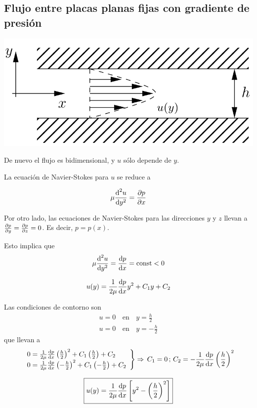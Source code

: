 	
	\subsection{Flujo entre placas planas fijas con gradiente de presión	}
	
	\begin{center}
		\includegraphics[width=0.5\linewidth]{TeX_files/chapter05-FlujoViscoco/placas2}
	\end{center}
	

			De nuevo el flujo es bidimensional, y $u$ sólo depende de $y$.
			
			La ecuación de Navier-Stokes para $u$ se reduce a 
			
\begin{equation}
				\mu\frac{\text{d}^2 u}{\text{d} y^2}=\frac{\partial p}{\partial x}
\end{equation}
			

	
	Por otro lado, las ecuaciones de Navier-Stokes para las direcciones
	$y$ y $z$ llevan a $\frac{\partial p}{\partial y}=\frac{\partial p}{\partial z}=0$. Es decir, $p=p(x)$.
	
	Esto implica que 
	\[
	\mu\frac{\text{d}^2 u}{\text{d} y^2}=\frac{\textrm{d} p}{\textrm{d} x}=\text{const}<0
	\]
	
	\[
	u(y)=\frac{1}{2\mu}\frac{\textrm{d} p}{\textrm{d} x}y^{2}+C_{1}y+C_{2}
	\]

	Las condiciones de contorno son 
\begin{eqnarray*}
	u=0\, & \text{en} & \,y=\frac{h}{2}\\
	u=0\, & \text{en} & \,y=-\frac{h}{2}
\end{eqnarray*}
que llevan a 
\[
\left.\begin{array}{l}
	0=\frac{1}{2\mu}\frac{\textrm{d} p}{\textrm{d} x}\left(\frac{h}{2}\right)^{2}+C_{1}\left(\frac{h}{2}\right)+C_{2}\\
	0=\frac{1}{2\mu}\frac{\textrm{d} p}{\textrm{d} x}\left(-\frac{h}{2}\right)^{2}+C_{1}\left(-\frac{h}{2}\right)+C_{2}
\end{array}\right\} \Rightarrow\,C_{1}=0\,;\,C_{2}=-\frac{1}{2\mu}\frac{\textrm{d} p}{\textrm{d} x}\left(\frac{h}{2}\right)^{2}
\]


\begin{equation}
	\boxed{u(y)=\frac{1}{2\mu}\frac{\textrm{d} p}{\textrm{d} x}\left[y^{2}-\left(\frac{h}{2}\right)^{2}\right]}
\end{equation}


